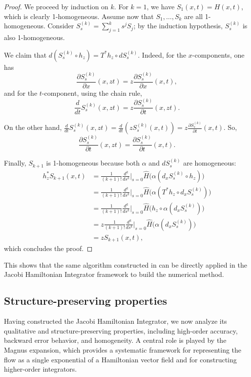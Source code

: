 \documentclass[12pt,english]{article}
\begin{document}
\begin{proof}
    We proceed by induction on $k$. For $k=1$, we have $S_1(x,t) = H(x,t)$, which is clearly 1-homogeneous. Assume now that $S_1, \dots, S_k$ are all 1-homogeneous. Consider $S_s^{(k)} = \sum_{j=1}^k s^j S_j$; by the induction hypothesis, $S_s^{(k)}$ is also 1-homogeneous.  

We claim that $d(S_s^{(k)} \circ h_z) = T^*h_z \circ d S_s^{(k)}$. Indeed, for the $x$-components, one has
\[
    \frac{\partial S_s^{(k)}}{\partial x}(x, zt) = z \frac{\partial S_s^{(k)}}{\partial x}(x, t),
\]
and for the $t$-component, using the chain rule,
\[
    \frac{d}{dt}S_s^{(k)} (x,zt) = z \frac{\partial S^{(k)}_s}{\partial t}(x,zt). 
\]

On the other hand, $\frac{d}{dt}S_s^{(k)} (x,zt) = \frac{d}{dt}\left(zS_s^{(k)} (x,t) \right) = z \frac{\partial S^{(k)}_s}{\partial t}(x,t)$. So,
\[\frac{\partial S_s^{(k)}}{\partial t} (x,zt) =\frac{\partial S_s^{(k)}}{\partial t} (x,t).\]
        

Finally, $S_{k+1}$ is 1-homogeneous because both $\alpha$ and $dS_s^{(k)}$ are homogeneous:
\begin{align*}
    h_z^* S_{k+1}(x,t) &= \frac{1}{(k+1)!} \frac{d^k}{ds^k}\Big|_{s=0} \hat{H}\Big( \alpha(d_x S_s^{(k)} \circ h_z) \Big)\\
    &= \frac{1}{(k+1)!} \frac{d^k}{ds^k}\Big|_{s=0} \hat{H}\Big( \alpha(T^*h_z \circ d_x S_s^{(k)}) \Big)\\
    &= \frac{1}{(k+1)!} \frac{d^k}{ds^k}\Big|_{s=0} \hat{H}\Big( h_z \circ \alpha(d_x S_s^{(k)}) \Big)\\
    &= z \frac{1}{(k+1)!} \frac{d^k}{ds^k}\Big|_{s=0} \hat{H}\Big( \alpha(d_x S_s^{(k)}) \Big)\\
    &= z S_{k+1}(x,t), 
\end{align*}
which concludes the proof.
\end{proof} 

This shows that the same algorithm constructed in \cite{cosserat2023numerical} can be directly applied in the Jacobi Hamiltonian Integrator framework to build the numerical method. 


\subsection{Structure-preserving properties}
\label{sec:qualitative}

Having constructed the Jacobi Hamiltonian Integrator, we now analyze its qualitative and structure-preserving properties, including high-order accuracy, backward error behavior, and homogeneity. A central role is played by the Magnus expansion, which provides a systematic framework for representing the flow as a single exponential of a Hamiltonian vector field and for constructing higher-order integrators.
\end{document}

